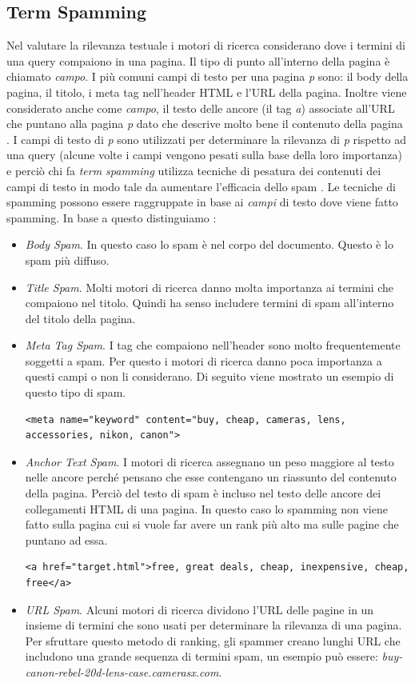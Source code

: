 \subsection{Term Spamming}
Nel valutare la rilevanza testuale i motori di ricerca considerano dove i termini di una query compaiono in una pagina. Il tipo di punto all'interno della pagina è chiamato \textit{campo}. I più comuni campi di testo per una pagina \textit{p} sono: il body della pagina, il titolo, i meta tag nell'header HTML e l'URL della pagina. Inoltre viene considerato anche come \textit{campo}, il testo delle ancore (il tag \textit{a}) associate all'URL che puntano alla pagina \textit{p} dato che descrive molto bene il contenuto della pagina . I campi di testo  di \textit{p} sono utilizzati per determinare la rilevanza di \textit{p} rispetto ad una query (alcune volte i campi vengono pesati sulla base della loro importanza) e perciò chi fa \textit{term spamming} utilizza tecniche di pesatura dei contenuti dei campi di testo in modo tale da aumentare l'efficacia dello spam \cite{ilprints646}. Le tecniche di spamming possono essere raggruppate in base ai \textit{campi} di testo dove viene fatto spamming. In base a 
questo distinguiamo \cite{ilprints646}:
\begin{itemize}
\item \textit{Body Spam}. In questo caso lo spam è nel corpo del documento. Questo è lo spam più diffuso.
\item \textit{Title Spam}. Molti motori di ricerca danno molta importanza ai termini che compaiono nel titolo. Quindi ha senso includere termini di spam all'interno del titolo della pagina.
\item \textit{Meta Tag Spam}. I tag che compaiono nell'header sono molto frequentemente soggetti a spam. Per questo i motori di ricerca danno poca importanza a questi campi o non li considerano. Di seguito viene mostrato un esempio di questo tipo di spam.
\begin{lstlisting}[frame=trbl,postbreak=\space, breakindent=5pt, breaklines]
 <meta name="keyword" content="buy, cheap, cameras, lens, accessories, nikon, canon">
\end{lstlisting}
\item \textit{Anchor Text Spam}. I motori di ricerca assegnano un peso maggiore al testo nelle ancore perché pensano che esse contengano un riassunto del contenuto della pagina. Perciò del testo di spam è incluso nel testo delle ancore dei collegamenti HTML di una pagina. In questo caso lo spamming non viene fatto sulla pagina cui si vuole far avere un rank più alto ma sulle pagine che puntano ad essa.
\begin{lstlisting}[frame=trbl,postbreak=\space, breakindent=5pt, breaklines]
<a href="target.html">free, great deals, cheap, inexpensive, cheap, free</a>
\end{lstlisting}
\item \textit{URL Spam}. Alcuni motori di ricerca dividono l'URL delle pagine in un insieme di termini che sono usati per determinare la rilevanza di una pagina. Per sfruttare questo metodo di ranking, gli spammer creano lunghi URL che includono una grande sequenza di termini spam, un esempio può essere: \textit{buy-canon-rebel-20d-lens-case.camerasx.com}.
\end{itemize}
